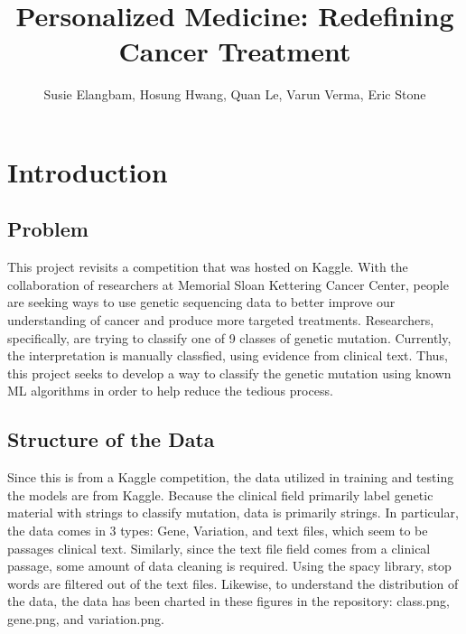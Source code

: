 \documentclass{article}
\title{Personalized Medicine: Redefining Cancer Treatment}
\author{Susie Elangbam, Hosung Hwang, Quan Le, Varun Verma, Eric Stone}
\begin{document}
    \maketitle
    
    \iffalse
    this won't appear in the final pdf.  just a reminder for anyone contributing.  
    REQUIREMENTS (verbatim as written in the doc)
    At a minimum, your final report must 
    describe the problem/application and motivation, survey related work, discuss your approach, and explain your
    results/conclusions/impact of your project. It should include enough detail such that someone else can reproduce
    your method and results. You are also required to provide a link to a GitHub repository where your code is stored.
    SUBMITTING DETAILS
    Save your report as a PDF file of 5 pages or less. Again, The corresponding member of the team should submit
    the final PDF and the GitHub link through Sakai by the announced deadline.
    \fi
    
    \section{Introduction}
    \subsection{Problem}
    This project revisits a competition that was hosted on Kaggle.  With the collaboration of researchers at Memorial Sloan Kettering Cancer Center, people are seeking ways to use genetic sequencing data to better improve our understanding of cancer and produce more targeted treatments.  Researchers, specifically, are trying to classify one of 9 classes of genetic mutation.  Currently, the interpretation is manually classfied, using evidence from clinical text. Thus, this project seeks to develop a way to classify the genetic mutation using known ML algorithms in order to help reduce the tedious process. 
    \subsection{Structure of the Data}
    Since this is from a Kaggle competition, the data utilized in training and testing the models are from Kaggle.  Because the clinical field primarily label genetic material with strings to classify mutation, data is primarily strings. In particular, the data comes in 3 types: Gene, Variation, and text files, which seem to be passages clinical text.  Similarly, since the text file field comes from a clinical passage, some amount of data cleaning is required.  Using the spacy library, stop words are filtered out of the text files.  Likewise, to understand the distribution of the data, the data has been charted in these figures in the repository: class.png, gene.png, and variation.png.  
\end{document}
